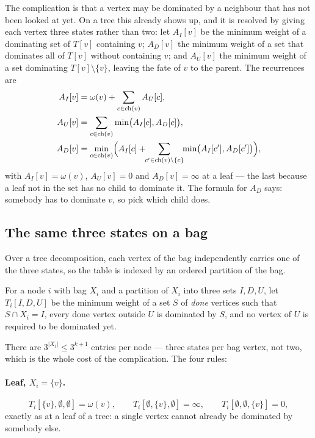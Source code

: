 The complication is that a vertex may be dominated by a neighbour that has not
been looked at yet. On a tree this already shows up, and it is resolved by
giving each vertex three states rather than two: let $A_I[v]$ be the minimum
weight of a dominating set of $T[v]$ containing $v$; $A_D[v]$ the minimum weight
of a set that dominates all of $T[v]$ without containing $v$; and $A_U[v]$ the
minimum weight of a set dominating $T[v] \setminus \{v\}$, leaving the fate of
$v$ to the parent. The recurrences are
\begin{align*}
  A_I[v] &= \omega(v) + \sum_{c \in \mathrm{ch}(v)} A_U[c], \\
  A_U[v] &= \sum_{c \in \mathrm{ch}(v)} \min\bigl(A_I[c], A_D[c]\bigr), \\
  A_D[v] &= \min_{c \in \mathrm{ch}(v)} \Bigl( A_I[c] +
            \!\!\sum_{c' \in \mathrm{ch}(v) \setminus \{c\}}\!\!
            \min\bigl(A_I[c'], A_D[c']\bigr) \Bigr),
\end{align*}
with $A_I[v] = \omega(v)$, $A_U[v] = 0$ and $A_D[v] = \infty$ at a leaf --- the
last because a leaf not in the set has no child to dominate it. The formula for
$A_D$ says: somebody has to dominate $v$, so pick which child does.

\subsection{The same three states on a bag}

Over a tree decomposition, each vertex of the bag independently carries one of
the three states, so the table is indexed by an ordered partition of the bag.

\begin{definition}\label{def:tw-ds-table}
For a node $i$ with bag $X_i$ and a partition of $X_i$ into three sets
$I, D, U$, let $T_i[I,D,U]$ be the minimum weight of a set $S$ of \emph{done}
vertices such that $S \cap X_i = I$, every done vertex outside $U$ is dominated
by $S$, and no vertex of $U$ is required to be dominated yet.
\end{definition}

There are $3^{|X_i|} \le 3^{k+1}$ entries per node --- three states per bag
vertex, not two, which is the whole cost of the complication. The four rules:

\paragraph{Leaf, $X_i = \{v\}$.}
\[ T_i[\{v\},\emptyset,\emptyset] = \omega(v), \qquad
   T_i[\emptyset,\{v\},\emptyset] = \infty, \qquad
   T_i[\emptyset,\emptyset,\{v\}] = 0, \]
exactly as at a leaf of a tree: a single vertex cannot already be dominated by
somebody else.

